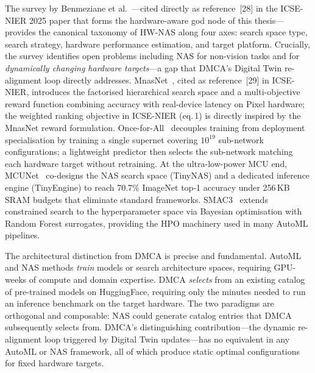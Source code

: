 The survey by Benmeziane et al.~\cite{benmeziane2021hwnas}---cited
directly as reference~[28] in the ICSE-NIER 2025 paper that forms
the hardware-aware god node of this thesis---provides the canonical
taxonomy of HW-NAS along four axes: search space type, search
strategy, hardware performance estimation, and target platform.
Crucially, the survey identifies open problems including NAS for
non-vision tasks and for \emph{dynamically changing hardware
targets}---a gap that DMCA's Digital Twin re-alignment loop
directly addresses.
MnasNet~\cite{tan2019mnasnet}, cited as reference~[29] in
ICSE-NIER, introduces the factorised hierarchical search space and
a multi-objective reward function combining accuracy with real-device
latency on Pixel hardware; the weighted ranking objective in
ICSE-NIER (eq.\,1) is directly inspired by the MnasNet reward
formulation.
Once-for-All~\cite{cai2020ofa} decouples training from deployment
specialisation by training a single supernet covering $10^{19}$
sub-network configurations; a lightweight predictor then selects
the sub-network matching each hardware target without retraining.
At the ultra-low-power MCU end, MCUNet~\cite{lin2020mcunet}
co-designs the NAS search space (TinyNAS) and a dedicated inference
engine (TinyEngine) to reach 70.7\% ImageNet top-1 accuracy under
256\,KB SRAM budgets that eliminate standard frameworks.
SMAC3~\cite{lindauer2022smac3} extends constrained search to the
hyperparameter space via Bayesian optimisation with Random Forest
surrogates, providing the HPO machinery used in many AutoML
pipelines.

The architectural distinction from DMCA is precise and fundamental.
AutoML and NAS methods \emph{train} models or search architecture
spaces, requiring GPU-weeks of compute and domain expertise.
DMCA \emph{selects} from an existing catalog of pre-trained models
on HuggingFace, requiring only the minutes needed to run an
inference benchmark on the target hardware.
The two paradigms are orthogonal and composable: NAS could
generate catalog entries that DMCA subsequently selects from.
DMCA's distinguishing contribution---the dynamic re-alignment
loop triggered by Digital Twin updates---has no equivalent in
any AutoML or NAS framework, all of which produce static
optimal configurations for fixed hardware targets.

